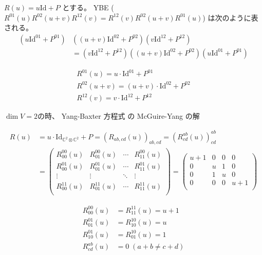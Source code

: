 \documentclass[12pt,a4paper]{ltjsarticle}
\begin{document}
\dotfill

$R(u)=u \mathrm{Id} + P$ とする。
YBE ($R^{01}(u) R^{02}(u+v) R^{12}(v) = R^{12}(v) R^{02}(u+v) R^{01}(u)$) は次のように表される。
\begin{equation}
 \begin{split}
  (u \mathrm{Id}^{01} + P^{01})& ((u+v) \mathrm{Id}^{02} + P^{02}) (v \mathrm{Id}^{12} + P^{12})\\
  &=   (v \mathrm{Id}^{12} + P^{12}) ((u+v) \mathrm{Id}^{02} + P^{02}) (u \mathrm{Id}^{01} + P^{01})
 \end{split}
\end{equation}

\begin{gather}
 R^{01}(u) = u \cdot \mathrm{Id}^{01} + P^{01}\\
 R^{02}(u+v) = (u+v) \cdot \mathrm{Id}^{02} + P^{02}\\
 R^{12}(v) = v \cdot \mathrm{Id}^{12} + P^{12}
\end{gather}


\dotfill

$\dim{V}=2$の時、
Yang-Baxter 方程式 の McGuire-Yang の解

\begin{align}
 R(u)
  &= u \cdot \mathrm{Id}_{\mathbb{C}^{2} \otimes \mathbb{C}^{2}} + P
  = \left( R_{ab,cd}(u) \right)_{ab,cd}
  = \left( R^{ab}_{cd}(u) \right)^{ab}_{cd}\\
  &=
  \begin{pmatrix}
   R^{00}_{00}(u) & R^{00}_{01}(u) & \cdots & R^{00}_{11}(u)\\
   R^{01}_{00}(u) & R^{01}_{01}(u) & \cdots & R^{01}_{11}(u)\\
   \vdots & \vdots & \ddots & \vdots\\
   R^{11}_{00}(u) & R^{11}_{01}(u) & \cdots & R^{11}_{11}(u)\\
  \end{pmatrix}
 =
  \begin{pmatrix}
   u+1 & 0 & 0 & 0\\
   0 & u & 1 & 0\\
   0 & 1 & u & 0\\
   0 & 0 & 0 & u+1\\
  \end{pmatrix}
\end{align}

\begin{align}
 R^{00}_{00}(u) &= R^{11}_{11}(u) = u+1\\
 R^{01}_{01}(u) &= R^{10}_{10}(u) = u\\
 R^{01}_{10}(u) &= R^{10}_{01}(u) = 1\\
 R^{ab}_{cd}(u) &= 0 \; (a+b \ne c+d)
\end{align}
\end{document}
